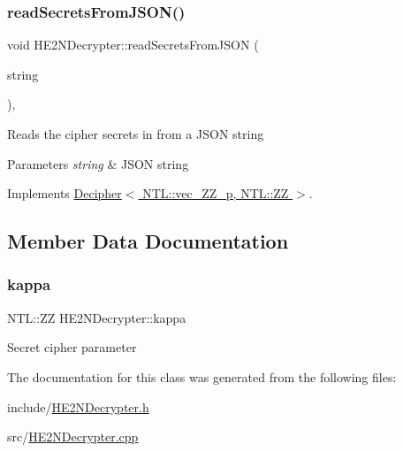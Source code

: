 \mbox{\label{classHE2NDecrypter_a92b463d8e18d2f06d0680528edfd49c4}} 
\subsubsection{\texorpdfstring{read\+Secrets\+From\+J\+S\+O\+N()}{readSecretsFromJSON()}}
{\footnotesize\ttfamily void H\+E2\+N\+Decrypter\+::read\+Secrets\+From\+J\+S\+ON (\begin{DoxyParamCaption}\item[{std\+::string \&}]{string }\end{DoxyParamCaption})\hspace{0.3cm}{\ttfamily [override]}, {\ttfamily [virtual]}}

Reads the cipher secrets in from a J\+S\+ON string 
\begin{DoxyParams}{Parameters}
{\em string} & J\+S\+ON string \\
\hline
\end{DoxyParams}


Implements \hyperlink{classDecipher_a39aea002012130201e12a8fa7d84dda5}{Decipher$<$ N\+T\+L\+::vec\+\_\+\+Z\+Z\+\_\+p, N\+T\+L\+::\+Z\+Z $>$}.



\subsection{Member Data Documentation}
\mbox{\label{classHE2NDecrypter_ad3233fd048ef07f31e4f40ea941cce91}} 
\subsubsection{\texorpdfstring{kappa}{kappa}}
{\footnotesize\ttfamily N\+T\+L\+::\+ZZ H\+E2\+N\+Decrypter\+::kappa\hspace{0.3cm}{\ttfamily [private]}}

Secret cipher parameter 

The documentation for this class was generated from the following files\+:\begin{DoxyCompactItemize}
\item 
include/\hyperlink{HE2NDecrypter_8h}{H\+E2\+N\+Decrypter.\+h}\item 
src/\hyperlink{HE2NDecrypter_8cpp}{H\+E2\+N\+Decrypter.\+cpp}\end{DoxyCompactItemize}
